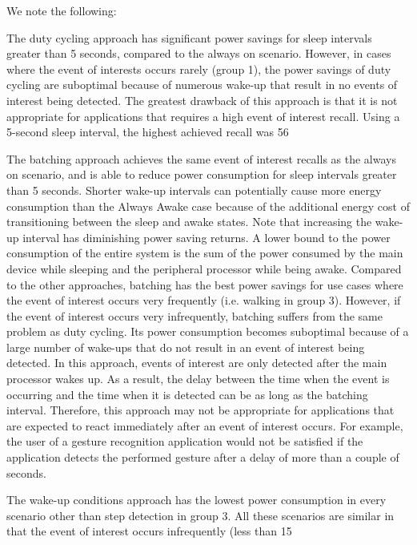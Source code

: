 We note the following:

The duty cycling approach has significant power savings for sleep intervals greater than 5 seconds, compared to the always on scenario. However, in cases where the event of interests occurs rarely (group 1), the power savings of duty cycling are suboptimal because of numerous wake-up that result in no events of interest being detected. The greatest drawback of this approach is that it is not appropriate for applications that requires a high event of interest recall. Using a 5-second sleep interval, the highest achieved recall was 56%

The batching approach achieves the same event of interest recalls as the always on scenario, and is able to reduce power consumption for sleep intervals greater than 5 seconds. Shorter wake-up intervals can potentially cause more energy consumption than the Always Awake case because of the additional energy cost of transitioning between the sleep and awake states. Note that increasing the wake-up interval has diminishing power saving returns. A lower bound to the power consumption of the entire system is the sum of the power consumed by the main device while sleeping and the peripheral processor while being awake. Compared to the other approaches, batching has the best power savings for use cases where the event of interest occurs very frequently (i.e. walking in group 3). However, if the event of interest occurs very infrequently, batching suffers from the same problem as duty cycling. Its power consumption becomes suboptimal because of a large number of wake-ups that do not result in an event of interest being detected. In this approach, events of interest are only detected after the main processor wakes up. As a result, the delay between the time when the event is occurring and the time when it is detected can be as long as the batching interval. Therefore, this approach may not be appropriate for applications that are expected to react immediately after an event of interest occurs. For example, the user of a gesture recognition application would not be satisfied if the application detects the performed gesture after a delay of more than a couple of seconds.

The wake-up conditions approach has the lowest power consumption in every scenario other than step detection in group 3. All these scenarios are similar in that the event of interest occurs infrequently (less than 15%

